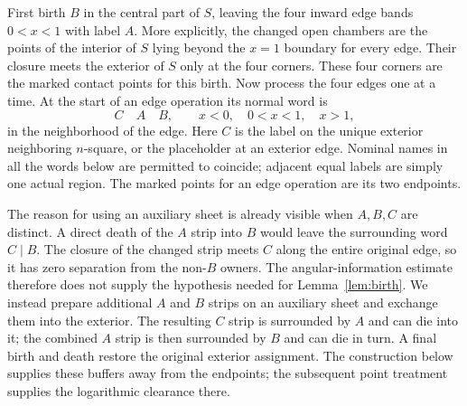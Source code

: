 \documentclass[11pt]{article}
\numberwithin{equation}{section}
\theoremstyle{definition}
\theoremstyle{remark}
\begin{document}
First birth $B$ in the central part of $S$, leaving the four inward
edge bands $0<x<1$ with label $A$.  More explicitly, the changed open
chambers are the points of the interior of $S$ lying beyond the
$x=1$ boundary for every edge.  Their closure meets the exterior of
$S$ only at the four corners.  These four corners are the marked
contact points for this birth.  Now process the four edges one at a
time.  At the start of an edge operation its normal word is
\[
 C\quad A\quad B,
 \qquad x<0,\quad 0<x<1,\quad x>1,
\]
in the neighborhood of the edge.  Here $C$ is the label on the unique
exterior neighboring $n$-square, or the placeholder at an exterior
edge.  Nominal names in all the words below are permitted to coincide;
adjacent equal labels are simply one actual region.  The marked points
for an edge operation are its two endpoints.

The reason for using an auxiliary sheet is already visible when $A,B,C$
are distinct.  A direct death of the $A$ strip into $B$ would leave the
surrounding word $C\mid B$.  The closure of the changed strip meets $C$
along the entire original edge, so it has zero separation from the
non-$B$ owners.  The angular-information estimate therefore does not
supply the hypothesis needed for Lemma~\ref{lem:birth}.  We instead prepare
additional $A$ and $B$ strips on an auxiliary sheet and exchange them into
the exterior.  The resulting $C$ strip is surrounded by $A$ and can die
into it; the combined $A$ strip is then surrounded by $B$ and can die in
turn.  A final birth and death restore the original exterior assignment.
The construction below supplies these buffers away from the endpoints;
the subsequent point treatment supplies the logarithmic clearance there.
\end{document}
